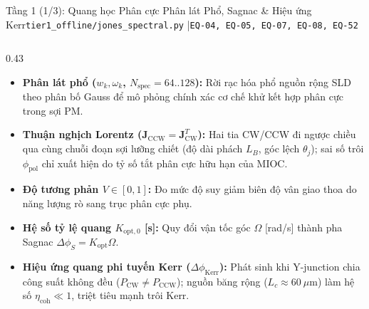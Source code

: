 \documentclass[aspectratio=169,8pt]{beamer}
\begin{document}
\begin{frame}{Tầng 1 (1/3): Quang học Phân cực Phân lát Phổ, Sagnac \& Hiệu ứng Kerr}{\texttt{tier1\_offline/jones\_spectral.py} \enspace|\enspace \texttt{EQ-04, EQ-05, EQ-07, EQ-08, EQ-52}}
\begin{columns}[T]
\begin{column}{0.43\textwidth}
\begin{remarkbox}
\begin{itemize}
        \item \textbf{Phân lát phổ ($w_k, \omega_k$, $N_{\text{spec}}=64..128$):} Rời rạc hóa phổ nguồn rộng SLD theo phân bố Gauss để mô phỏng chính xác cơ chế khử kết hợp phân cực trong sợi PM.
        \item \textbf{Thuận nghịch Lorentz ($\mathbf{J}_{\text{CCW}}=\mathbf{J}_{\text{CW}}^T$):} Hai tia CW/CCW đi ngược chiều qua cùng chuỗi đoạn sợi lưỡng chiết (độ dài phách $L_B$, góc lệch $\theta_j$); sai số trôi $\phi_{\text{pol}}$ chỉ xuất hiện do tỷ số tắt phân cực hữu hạn của MIOC.
        \item \textbf{Độ tương phản $V \in [0,1]$:} Đo mức độ suy giảm biên độ vân giao thoa do năng lượng rò sang trục phân cực phụ.
        \item \textbf{Hệ số tỷ lệ quang $K_{\text{opt},0}$ [s]:} Quy đổi vận tốc góc $\Omega$ [rad/s] thành pha Sagnac $\Delta\phi_S = K_{\text{opt}}\Omega$.
        \item \textbf{Hiệu ứng quang phi tuyến Kerr ($\Delta\phi_{\text{Kerr}}$):} Phát sinh khi Y-junction chia công suất không đều ($P_{\text{CW}}\ne P_{\text{CCW}}$); nguồn băng rộng ($L_c\approx 60\ \mu\text{m}$) làm hệ số $\eta_{\text{coh}}\ll 1$, triệt tiêu mạnh trôi Kerr.
      \end{itemize}
    \end{remarkbox}
  \end{column}
\end{columns}
\end{frame}
\end{document}
